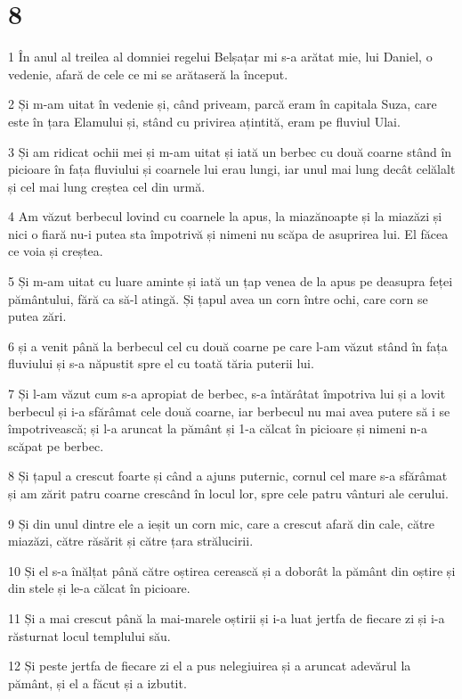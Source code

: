 \chapter{8}

\par 1 În anul al treilea al domniei regelui Belșațar mi s-a arătat mie, lui Daniel, o vedenie, afară de cele ce mi se arătaseră la început.
\par 2 Și m-am uitat în vedenie și, când priveam, parcă eram în capitala Suza, care este în țara Elamului și, stând cu privirea ațintită, eram pe fluviul Ulai.
\par 3 Și am ridicat ochii mei și m-am uitat și iată un berbec cu două coarne stând în picioare în fața fluviului și coarnele lui erau lungi, iar unul mai lung decât celălalt și cel mai lung creștea cel din urmă.
\par 4 Am văzut berbecul lovind cu coarnele la apus, la miazănoapte și la miazăzi și nici o fiară nu-i putea sta împotrivă și nimeni nu scăpa de asuprirea lui. El făcea ce voia și creștea.
\par 5 Și m-am uitat cu luare aminte și iată un țap venea de la apus pe deasupra feței pământului, fără ca să-l atingă. Și țapul avea un corn între ochi, care corn se putea zări.
\par 6 și a venit până la berbecul cel cu două coarne pe care l-am văzut stând în fața fluviului și s-a năpustit spre el cu toată tăria puterii lui.
\par 7 Și l-am văzut cum s-a apropiat de berbec, s-a întărâtat împotriva lui și a lovit berbecul și i-a sfărâmat cele două coarne, iar berbecul nu mai avea putere să i se împotrivească; și l-a aruncat la pământ și 1-a călcat în picioare și nimeni n-a scăpat pe berbec.
\par 8 Și țapul a crescut foarte și când a ajuns puternic, cornul cel mare s-a sfărâmat și am zărit patru coarne crescând în locul lor, spre cele patru vânturi ale cerului.
\par 9 Și din unul dintre ele a ieșit un corn mic, care a crescut afară din cale, către miazăzi, către răsărit și către țara strălucirii.
\par 10 Și el s-a înălțat până către oștirea cerească și a doborât la pământ din oștire și din stele și le-a călcat în picioare.
\par 11 Și a mai crescut până la mai-marele oștirii și i-a luat jertfa de fiecare zi și i-a răsturnat locul templului său.
\par 12 Și peste jertfa de fiecare zi el a pus nelegiuirea și a aruncat adevărul la pământ, și el a făcut și a izbutit.
